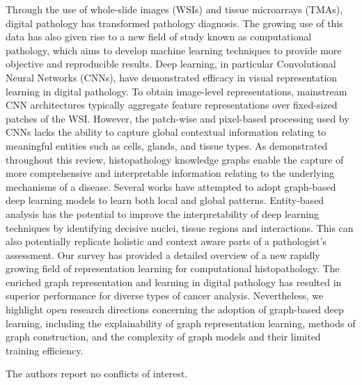 Through the use of whole-slide images (WSIs) and tissue microarrays (TMAs), digital pathology has transformed pathology diagnosis. The growing use of this data has also given rise to a new field of study known as computational pathology, which aims to develop machine learning techniques to provide more objective and reproducible results. 
Deep learning, in particular Convolutional Neural Networks (CNNs), have demonstrated efficacy in visual representation learning in digital pathology. To obtain image-level representations, mainstream CNN architectures typically aggregate feature representations over fixed-sized patches of the WSI. However, the patch-wise and pixel-based processing used by CNNs lacks the ability to capture global contextual information relating to meaningful entities such as cells, glands, and tissue types.
As demonstrated throughout this review, histopathology knowledge graphs enable the capture of more comprehensive and interpretable information relating to the underlying mechanisms of a disease.
Several works have attempted to adopt graph-based deep learning models to learn both local and global patterns. Entity-based analysis has the potential to improve the interpretability of deep learning techniques by identifying decisive nuclei, tissue regions and interactions. This can also potentially replicate holistic and context aware parts of a pathologist's assessment.
Our survey has provided a detailed overview of a new rapidly growing field of representation learning for computational histopathology. The enriched graph representation and learning in digital pathology has resulted in superior performance for diverse types of cancer analysis. Nevertheless, we highlight open research directions concerning the adoption of graph-based deep learning, including the explainability of graph representation learning, methods of graph construction, and the complexity of graph models and their limited training efficiency. 
\vspace{-6pt}

The authors report no conflicts of interest.
\ifCLASSOPTIONcaptionsoff
  \newpage
\fi
{\small
        
        
}
